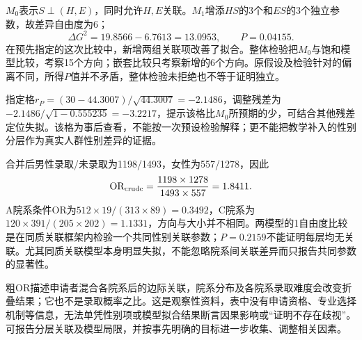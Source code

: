 $M_0$表示$S\perp(H,E)$，同时允许$H,E$关联。$M_1$增添$HS$的3个和$ES$的3个独立参数，故差异自由度为6；\[\Delta G^2=19.8566-6.7613=13.0953,\qquad P=0.04155.\]在预先指定的这次比较中，新增两组关联项改善了拟合。整体检验把$M_0$与饱和模型比较，考察15个方向；嵌套比较只考察新增的6个方向。原假设及检验针对的偏离不同，所得$P$值并不矛盾，整体检验未拒绝也不等于证明独立。\par 指定格$r_P=(30-44.3007)/\sqrt{44.3007}=-2.1486$，调整残差为$-2.1486/\sqrt{1-0.555235}=-3.2217$，提示该格比$M_0$所预期的少，可结合其他残差定位失拟。该格为事后查看，不能按一次预设检验解释；更不能把教学补入的性别分层作为真实人群性别差异的证据。
\par\nobreak\smallskip{}

合并后男性录取/未录取为1198/1493，女性为557/1278，因此\[\mathrm{OR}_{\rm crude}=\frac{1198\times1278}{1493\times557}=1.8411.\]A院系条件OR为$512\times19/(313\times89)=0.3492$，C院系为$120\times391/(205\times202)=1.1331$，方向与大小并不相同。两模型的1自由度比较是在同质关联框架内检验一个共同性别关联参数；$P=0.2159$不能证明每层均无关联。尤其同质关联模型本身明显失拟，不能忽略院系间关联差异而只报告共同参数的显著性。\par 粗OR描述申请者混合各院系后的边际关联，院系分布及各院系录取难度会改变折叠结果；它也不是录取概率之比。这是观察性资料，表中没有申请资格、专业选择机制等信息，无法单凭性别项或模型拟合结果断言因果影响或“证明不存在歧视”。可报告分层关联及模型局限，并按事先明确的目标进一步收集、调整相关因素。
\par\nobreak\smallskip{}
